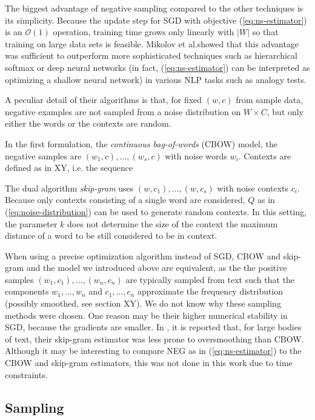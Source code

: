 \documentclass{amsart}
\theoremstyle{plain}
\theoremstyle{definition}
\begin{document}
The biggest advantage of negative sampling compared to the other techniques is its simplicity.
Because the update step for SGD with objective (\ref{eq:ns-estimator}) is an $\mathcal{O}(1)$ operation, training time grows only linearly with $|W|$ so that training on large data sets is feasible.
Mikolov et al.\@ showed that this advantage was sufficient to outperform more sophisticated techniques such as hierarchical softmax or deep neural networks (in fact, (\ref{eq:ns-estimator}) can be interpreted as optimizing a shallow neural network) in various NLP tasks such as analogy tests.

A peculiar detail of their algorithms is that, for fixed $(w, c)$ from sample data, negative examples are not sampled from a noise distribution on $W \times C$, but only either the words or the contexts are random.

In the first formulation, the \emph{continuous bag-of-words} (CBOW) model, the negative samples are $(w_1, c), \dots, (w_s, c)$ with noise words $w_i$.
Contexts are defined as in XY, i.e. the sequence  

The dual algorithm \emph{skip-gram} uses $(w, c_1), \dots, (w, c_s)$ with noise contexts $c_i$.
Because only contexts consisting of a single word are considered, $Q$ as in (\ref{eq:noise-distribution}) can be used to generate random contexts.
In this setting, the parameter $k$ does not determine the size of the context the maximum distance of a word to be still considered to be in context.



When using a precise optimization algorithm instead of SGD, CBOW and skip-gram and the model we introduced above are equivalent, as the the positive samples $(w_1, c_1), \dots, (w_n, c_n)$ are typically sampled from text such that the components $w_1, \dots, w_n$ and $c_1, \dots, c_n$ approximate the frequency distribution (possibly smoothed, see section XY).
We do not know why these sampling methods were chosen.
One reason may be their higher numerical stability in SGD, because the gradients are smaller.
In \cite{DBLP:journals/corr/MikolovSCCD13}, it is reported that, for large bodies of text, their skip-gram estimator was less prone to oversmoothing than CBOW.
Although it may be interesting to compare NEG as in (\ref{eq:ns-estimator}) to the CBOW and skip-gram estimators, this was not done in this work due to time constraints.

\subsection{Sampling}
\end{document}
